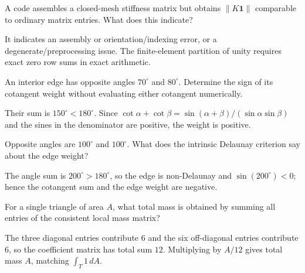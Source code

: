 \begin{problem}\label{prob:vii41-02}
A code assembles a closed-mesh stiffness matrix but obtains \(\|K\mathbf1\|\) comparable to ordinary matrix entries.  What does this indicate?
\end{problem}

\begin{solution}
It indicates an assembly or orientation/indexing error, or a degenerate/preprocessing issue.  The finite-element partition of unity requires exact zero row sums in exact arithmetic.
\end{solution}

\begin{problem}\label{prob:vii41-03}
An interior edge has opposite angles \(70^\circ\) and \(80^\circ\).  Determine the sign of its cotangent weight without evaluating either cotangent numerically.
\end{problem}

\begin{solution}
Their sum is \(150^\circ<180^\circ\).  Since \(\cot\alpha+\cot\beta=\sin(\alpha+\beta)/(\sin\alpha\sin\beta)\) and the sines in the denominator are positive, the weight is positive.
\end{solution}

\begin{problem}\label{prob:vii41-04}
Opposite angles are \(100^\circ\) and \(100^\circ\).  What does the intrinsic Delaunay criterion say about the edge weight?
\end{problem}

\begin{solution}
The angle sum is \(200^\circ>180^\circ\), so the edge is non-Delaunay and \(\sin(200^\circ)<0\); hence the cotangent sum and the edge weight are negative.
\end{solution}

\begin{problem}\label{prob:vii41-05}
For a single triangle of area \(A\), what total mass is obtained by summing all entries of the consistent local mass matrix?
\end{problem}

\begin{solution}
The three diagonal entries contribute \(6\) and the six off-diagonal entries contribute \(6\), so the coefficient matrix has total sum \(12\).  Multiplying by \(A/12\) gives total mass \(A\), matching \(\int_T 1\,dA\).
\end{solution}

